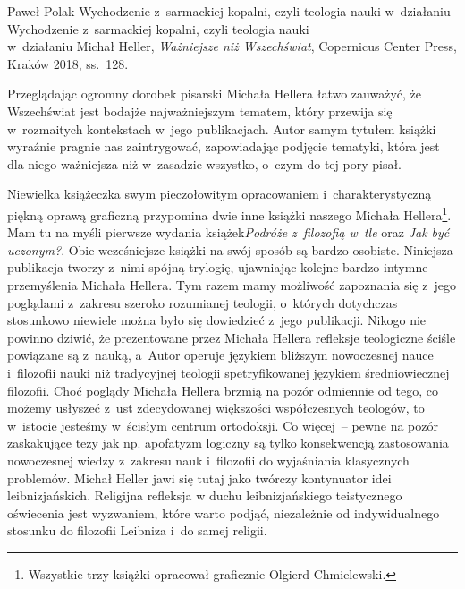 \begin{recplenv}{Paweł Polak}
	{Wychodzenie z~sarmackiej kopalni, czyli teologia nauki w~działaniu}
	{Wychodzenie z~sarmackiej kopalni, czyli teologia nauki\\w~działaniu}
	{Michał Heller, \textit{Ważniejsze niż Wszechświat}, Copernicus Center Press, Kraków 2018,
		ss.~128.}




Przeglądając ogromny dorobek pisarski Michała Hellera łatwo zauważyć, że Wszechświat jest bodajże najważniejszym
tematem, który przewija się w~rozmaitych kontekstach w~jego publikacjach. Autor samym tytułem książki wyraźnie pragnie
nas zaintrygować, zapowiadając podjęcie tematyki, która jest dla niego ważniejsza niż w~zasadzie wszystko, o~czym do
tej pory pisał.

Niewielka książeczka swym pieczołowitym opracowaniem i~charakterystyczną piękną oprawą graficzną przypomina dwie
inne książki naszego Michała Hellera\footnote{Wszystkie trzy książki opracował graficznie Olgierd Chmielewski.}. Mam tu
na myśli pierwsze wydania książek\textit{Podróże z~filozofią w~tle }oraz
\textit{Jak być uczonym?}. Obie wcześniejsze książki na swój sposób są bardzo
osobiste. Niniejsza publikacja tworzy z~nimi spójną trylogię, ujawniając kolejne bardzo intymne przemyślenia Michała
Hellera. Tym razem mamy możliwość zapoznania się z~jego poglądami z~zakresu szeroko rozumianej teologii, o~których
dotychczas stosunkowo niewiele można było się dowiedzieć z~jego publikacji. Nikogo nie powinno dziwić, że prezentowane
przez Michała Hellera refleksje teologiczne ściśle powiązane są z~nauką, a~Autor operuje językiem bliższym nowoczesnej
nauce i~filozofii nauki niż tradycyjnej teologii spetryfikowanej językiem średniowiecznej filozofii. Choć poglądy
Michała Hellera brzmią na pozór odmiennie od tego, co możemy usłyszeć z~ust zdecydowanej większości współczesnych
teologów, to w~istocie jesteśmy w~ścisłym centrum ortodoksji. Co więcej~-- pewne na pozór zaskakujące tezy jak np.
apofatyzm logiczny są tylko konsekwencją zastosowania nowoczesnej wiedzy z~zakresu nauk i~filozofii do wyjaśniania
klasycznych problemów. Michał Heller jawi się tutaj jako twórczy kontynuator idei leibnizjańskich. Religijna refleksja
w duchu leibnizjańskiego teistycznego oświecenia jest wyzwaniem, które warto podjąć, niezależnie od indywidualnego
stosunku do filozofii Leibniza i~do samej religii.


\end{recplenv}

